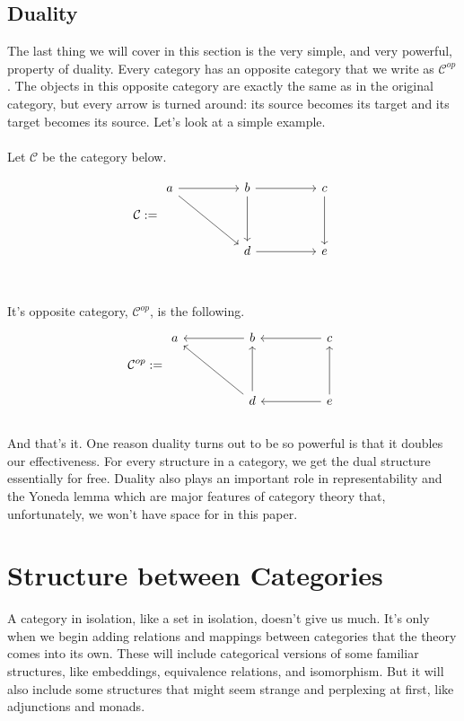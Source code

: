 \documentclass[12pt]{article}
\newcounter{examp}
\begin{document}
\subsection*{Duality}
The last thing we will cover in this section is the very simple, and very powerful, property of duality.
Every category has an opposite category that we write as $\mathcal{C}^{op}$.
The objects in this opposite category are exactly the same as in the original category, but every arrow is turned around: its source becomes its target and its target becomes its source.
Let's look at a simple example.\\\\
Let $\mathcal{C}$ be the category below.

\[\mathcal{C} := \begin{tikzcd}
        a && b && c \\
        \\
        && d && e
        \arrow[from=1-1, to=1-3]
        \arrow[from=1-1, to=3-3]
        \arrow[from=1-3, to=3-3]
        \arrow[from=3-3, to=3-5]
        \arrow[from=1-3, to=1-5]
        \arrow[from=1-5, to=3-5]
    \end{tikzcd}\]
\\\\It's opposite category, $\mathcal{C}^{op}$, is the following.
\[\mathcal{C}^{op} := \begin{tikzcd}
        a && b && c \\
        \\
        && d && e
        \arrow[from=1-3, to=1-1]
        \arrow[from=3-3, to=1-1]
        \arrow[from=3-3, to=1-3]
        \arrow[from=3-5, to=3-3]
        \arrow[from=1-5, to=1-3]
        \arrow[from=3-5, to=1-5]
    \end{tikzcd}\]
\\
And that's it.
One reason duality turns out to be so powerful is that it doubles our effectiveness.
For every structure in a category, we get the dual structure essentially for free.
Duality also plays an important role in representability and the Yoneda lemma which are major features of category theory that, unfortunately, we won't have space for in this paper.








\section*{Structure between Categories}
A category in isolation, like a set in isolation, doesn't give us much.
It's only when we begin adding relations and mappings between categories that the theory comes into its own.
These will include categorical versions of some familiar structures, like embeddings, equivalence relations, and isomorphism.
But it will also include some structures that might seem strange and perplexing at first, like adjunctions and monads.
\end{document}
